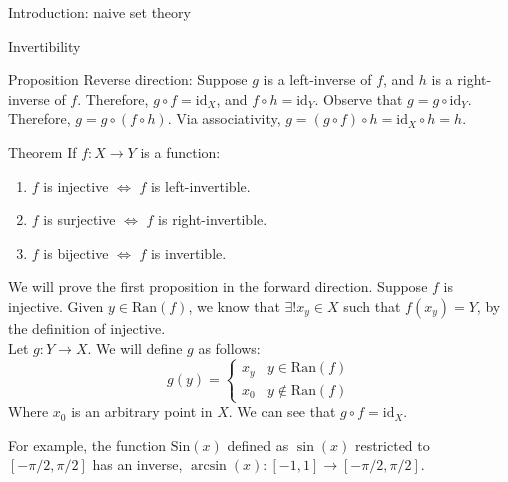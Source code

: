 \documentclass[10pt]{extarticle}
\begin{document}
{\begin{problem}{Introduction: naive set theory}
\begin{problem}{Invertibility}
\begin{problem}{Proposition}
          Reverse direction: Suppose $g$ is a left-inverse of $f$, and $h$ is a right-inverse of $f$. Therefore, $g\circ f = \textrm{id}_X$, and $f\circ h = \textrm{id}_Y$. Observe that $g = g\circ \textrm{id}_Y$. Therefore, $g = g\circ(f\circ h)$. Via associativity, $g = (g\circ f)\circ h = \textrm{id}_X \circ h = h$.
      \end{problem}
      \begin{problem}{Theorem}
        If $f:X\rightarrow Y$ is a function:
        \begin{enumerate}
          \item $f$ is injective $\Leftrightarrow$ $f$ is left-invertible.
          \item $f$ is surjective $\Leftrightarrow$ $f$ is right-invertible.
          \item $f$ is bijective $\Leftrightarrow$ $f$ is invertible.
        \end{enumerate}
        \tcblower
        We will prove the first proposition in the forward direction. Suppose $f$ is injective. Given $y\in \textrm{Ran}(f)$, we know that $\exists! x_y\in X$ such that $f(x_y) = Y$, by the definition of injective.\\

        Let $g:Y\rightarrow X$. We will define $g$ as follows:
        \[
          g(y) = \begin{cases}
            x_y & y\in \textrm{Ran}(f) \\
            x_0 & y\notin \textrm{Ran}(f)
          \end{cases}
        \] 
        Where $x_0$ is an arbitrary point in $X$. We can see that $g\circ f = \textrm{id}_X$.
      \end{problem}
      For example, the function $\textrm{Sin}(x)$ defined as $\sin(x)$ restricted to $[-\pi/2,\pi/2]$ has an inverse, $\arcsin(x):[-1,1] \rightarrow [-\pi/2,\pi/2]$.
    \end{problem}
  \end{problem}
}
\end{document}
